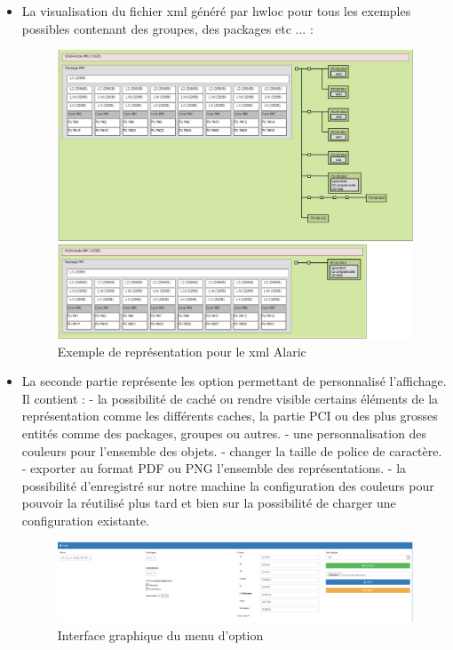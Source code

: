 \documentclass [a4paper,11pt]{article}
\begin{document}
\begin{itemize}
\item La visualisation du fichier xml généré par hwloc pour tous les exemples possibles contenant des groupes, des packages etc ... : 

\begin{figure}[!h]
\centering
\includegraphics[scale=0.5]{img/alaric.png}
\caption[Résultats]{Exemple de représentation pour le xml Alaric}
\end{figure}

\item La seconde partie représente les option permettant de personnalisé l'affichage. Il contient : \newline
- la possibilité de caché ou rendre visible certains éléments de la représentation comme les différents caches, la partie PCI ou des plus grosses entités comme des packages, groupes ou autres. \newline
- une personnalisation des couleurs pour l'ensemble des objets. \newline
- changer la taille de police de caractère. \newline
- exporter au format PDF ou PNG l'ensemble des représentations.
- la possibilité d'enregistré sur notre machine la configuration des couleurs pour pouvoir la réutilisé plus tard et bien sur la possibilité de charger une configuration existante.

\begin{figure}[!h]
\centering
\includegraphics[scale=0.3]{img/filtre.png}
\caption[Résultats]{ Interface graphique du menu d'option }
\end{figure}


\end{itemize}
\end{document}
